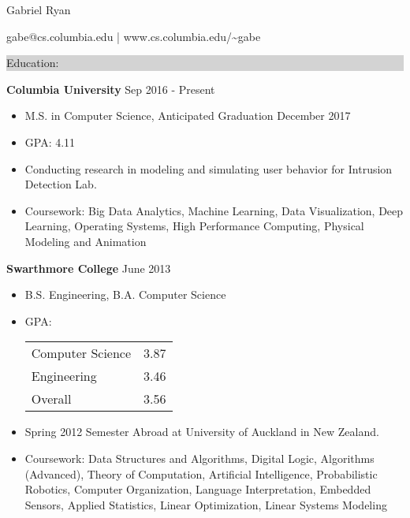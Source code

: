 \documentclass{article} %
\newcommand{\rsection}[1]{
\hspace{-0.4cm}
\colorbox{lightgrey}{
\begin{minipage}{1.07\linewidth}
\vspace{0.25cm}
\fontsize{14pt}{16pt}\selectfont #1 
\vspace{0.15cm}
\end{minipage}
}
\vspace*{-0.2cm}
}
\newcommand{\rjob}[2]{
\vspace{0.1cm}
\hspace*{-0.3cm}  
{\fontsize{10pt}{12pt}\selectfont #1} \hfill #2 
\vspace*{0.1cm} 
\hspace*{-1.2cm}
}
\newenvironment{ritemize}{
\hspace*{-0.8cm} 
\begin{minipage}{1.05\linewidth}
\begin{itemize}
}{
\end{itemize}
\end{minipage}
\vspace{-0.2cm}
}
\newcommand{\ritem}{
\item[-]
}
\begin{document}
\hspace*{-0.45cm} 
{\fontsize{22pt}{22pt}\selectfont Gabriel Ryan}\\
\begin{minipage}{\linewidth}
\vspace{0.1cm}
gabe@cs.columbia.edu | www.cs.columbia.edu/\textasciitilde gabe
\end{minipage}
\vspace{-0.15cm}


\rsection{Education:} 

\rjob{\textbf{Columbia University}}{Sep 2016 - Present}\\
\begin{ritemize}
\ritem M.S. in Computer Science, Anticipated Graduation December 2017
\ritem GPA: 4.11
\ritem Conducting research in modeling and simulating user behavior for Intrusion Detection Lab.
\ritem Coursework: Big Data Analytics, Machine Learning, Data Visualization, Deep Learning, Operating Systems, High Performance Computing, Physical Modeling and Animation
\end{ritemize}

\rjob{\textbf{Swarthmore College}}{June 2013}\\
\begin{ritemize}
\ritem B.S. Engineering, B.A. Computer Science
\ritem GPA: \begin{tabular}[t]{lr} Computer Science & 3.87\\
Engineering & 3.46 \\
Overall & 3.56
\end{tabular}
\ritem Spring 2012 Semester Abroad at University of Auckland in New Zealand.
\ritem Coursework: Data Structures and Algorithms, Digital Logic, Algorithms (Advanced), Theory of Computation, Artificial Intelligence, Probabilistic Robotics, Computer Organization,  Language Interpretation, Embedded Sensors, Applied Statistics, Linear Optimization, Linear Systems Modeling
\end{ritemize}
\vspace{0.25cm}
\end{document}
